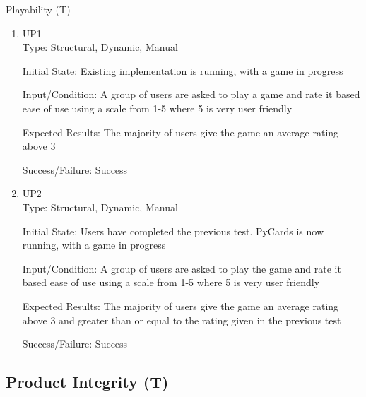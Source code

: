 \documentclass[12pt, titlepage]{article}
\newcounter{tnum}
\newcommand{\tthetnum}{T\thetnum}
\begin{document}
	\begin{description}
		\item[Playability (\tthetnum \label{tPlay})]
	\end{description}
	\begin{enumerate}
		\item{UP1\\}
		Type: Structural, Dynamic, Manual
		
		Initial State: Existing implementation is running, with a game in progress
		
		Input/Condition: A group of users are asked to play a game and rate it based
		ease of use using a scale from 1-5 where 5 is very user friendly
		
		Expected Results: The majority of users give the game an average rating above 3

		Success/Failure: Success

		\item{UP2\\}
		Type: Structural, Dynamic, Manual
		
		Initial State: Users have completed the previous test. PyCards is now running,
		with a game in progress
		
		Input/Condition: A group of users are asked to play the game and rate it based
		ease of use using a scale from 1-5 where 5 is very user friendly
		
		Expected Results: The majority of users give the game an average rating above 3
		and greater than or equal to the rating given in the previous test

		Success/Failure: Success
	\end{enumerate}


	 \label{tInt}
	\subsection{Product Integrity (\tthetnum)}
\end{document}
